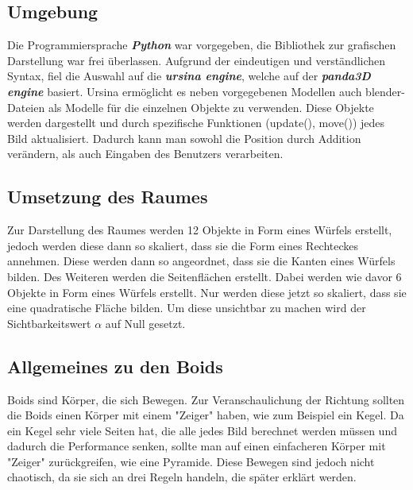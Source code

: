 \documentclass[a4paper, 12pt]{article}
\begin{document}
	\subsection{Umgebung}
		Die Programmiersprache \emph{\textbf{Python}} war vorgegeben, die Bibliothek zur grafischen Darstellung war frei überlassen. Aufgrund der eindeutigen und verständlichen Syntax, fiel die Auswahl auf die \emph{\textbf{ursina engine}}, welche auf der \emph{\textbf{panda3D engine}} basiert. Ursina ermöglicht es neben vorgegebenen Modellen auch blender-Dateien als Modelle für die einzelnen Objekte zu verwenden. Diese Objekte werden dargestellt und durch spezifische Funktionen (update(), move()) jedes Bild aktualisiert. Dadurch kann man sowohl die Position durch Addition verändern, als auch Eingaben des Benutzers verarbeiten. 
	
	\subsection{Umsetzung des Raumes}
		Zur Darstellung des Raumes werden 12 Objekte in Form eines Würfels erstellt, jedoch werden diese dann so skaliert, dass sie die Form eines Rechteckes annehmen. Diese werden dann so angeordnet, dass sie die Kanten eines Würfels bilden. 
		Des Weiteren werden die Seitenflächen erstellt. Dabei werden wie davor 6 Objekte in Form eines Würfels erstellt. Nur werden diese jetzt so skaliert, dass sie eine quadratische Fläche bilden. Um diese unsichtbar zu machen wird der Sichtbarkeitswert $\alpha$ auf Null gesetzt.
		
	\subsection{Allgemeines zu den Boids}
		Boids sind Körper, die sich Bewegen. Zur Veranschaulichung der Richtung sollten die Boids einen Körper mit einem "Zeiger" haben, wie zum Beispiel ein Kegel. Da ein Kegel sehr viele Seiten hat, die alle jedes Bild berechnet werden müssen und dadurch die Performance senken, sollte man auf einen einfacheren Körper mit "Zeiger" zurückgreifen, wie eine Pyramide.  Diese Bewegen sind jedoch nicht chaotisch, da sie sich an drei Regeln handeln, die später erklärt werden.\linebreak
		
\end{document}
